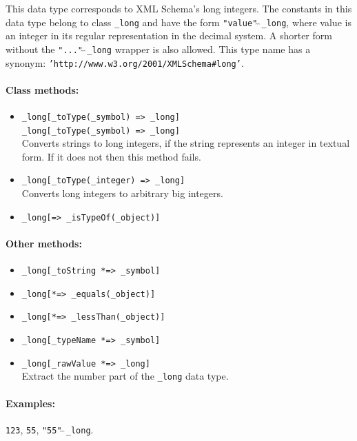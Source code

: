 \documentclass[11pt]{article}
\begin{document}
This data type corresponds to XML Schema's long integers.
The constants in this data type belong to class {\tt \_long} and have the
form {\tt "value"$\hat{~}\hat{~}$\_long}, where value is an integer in its regular
representation in the decimal system. A shorter form without the
{\tt "..."$\hat{~}\hat{~}$\_long}  wrapper is also allowed.
This type name has a synonym: {\tt 'http://www.w3.org/2001/XMLSchema\#long'}. 

\paragraph{Class methods:}
\begin{itemize}
    \item {\tt \_long[\_toType(\_symbol) => \_long]}   \\
    {\tt \_long[\_toType(\_symbol) => \_long]}   \\
      Converts strings to long integers, if the string represents an integer in textual form. If it does not then this method fails.
    \item {\tt \_long[\_toType(\_integer) => \_long]}   \\
     Converts long integers to arbitrary big integers.
    \item {\tt \_long[=> \_isTypeOf(\_object)]}  
\end{itemize}

\paragraph{Other methods:}
\begin{itemize}
\item {\tt \_long[\_toString *=> \_symbol]}  
\item {\tt \_long[*=> \_equals(\_object)]}  
\item {\tt \_long[*=> \_lessThan(\_object)]}  
\item {\tt \_long[\_typeName *=> \_symbol]}   
\item {\tt \_long[\_rawValue *=> \_long]}
  \\
  Extract the number part of the {\tt \_long} data type. 
\end{itemize}

\paragraph{Examples:} {\tt 123},  {\tt 55}, {\tt "55"$\hat{~}\hat{~}$\_long}.
\end{document}

